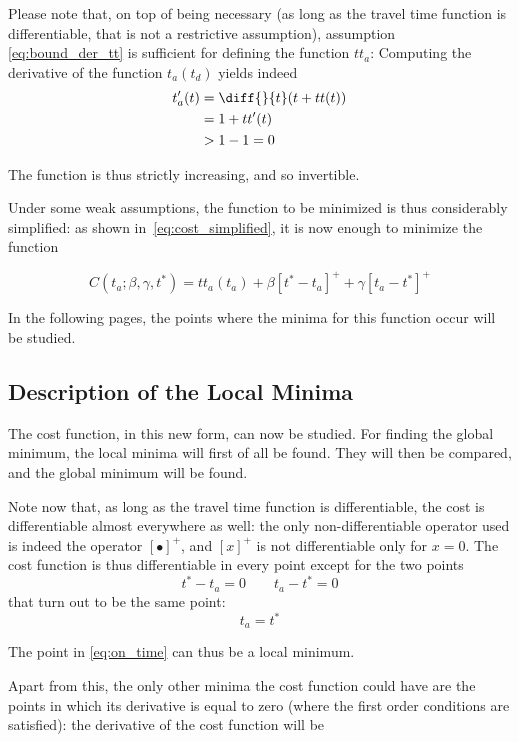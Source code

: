 Please note that, on top of being necessary (as long as the travel time function is differentiable, that is not a restrictive assumption),
assumption \eqref{eq:bound_der_tt} is sufficient for defining the function \(tt_a\):
Computing the derivative of the function \(t_a(t_d)\) yields indeed
\begin{align*}
  t_a'(t) & = \diff{}{t}(t + tt(t)) \\
          & = 1 + tt'(t) \\
          & > 1 - 1 = 0
\end{align*}

The function is thus strictly increasing, and so invertible.

Under some weak assumptions, the function to be minimized is thus considerably simplified:
as shown in~\eqref{eq:cost_simplified}, it is now enough to minimize the function

\begin{equation}
  \label{eq:cost_simplified_final}
  C(t_a; \beta, \gamma, t^*) = tt_a(t_a) + \beta [t^* - t_a]^+ + \gamma [t_a - t^*]^+
\end{equation}

In the following pages,
the points where the minima for this function occur will be studied.

\subsection{Description of the Local Minima}
\label{sec:local_min}

The cost function, in this new form, can now be studied.
For finding the global minimum, the local minima will first of all be found.
They will then be compared, and the global minimum will be found.

Note now that, as long as the travel time function is differentiable,
the cost is differentiable almost everywhere as well:
the only non-differentiable operator used is indeed the operator \([\bullet ]^+\),
and \([x]^+\) is not differentiable only for \(x = 0\).
The cost function is thus differentiable in every point except for the two points
\[ t^* - t_a = 0 \qquad t_a - t^* = 0 \]
that turn out to be the same point:
\begin{equation}
  \label{eq:on_time}
  t_a = t^*
\end{equation}

The point in \eqref{eq:on_time} can thus be a local minimum.

Apart from this, the only other minima the cost function could have are the points in which its derivative is equal to zero (where the first order conditions are satisfied):
the derivative of the cost function will be

